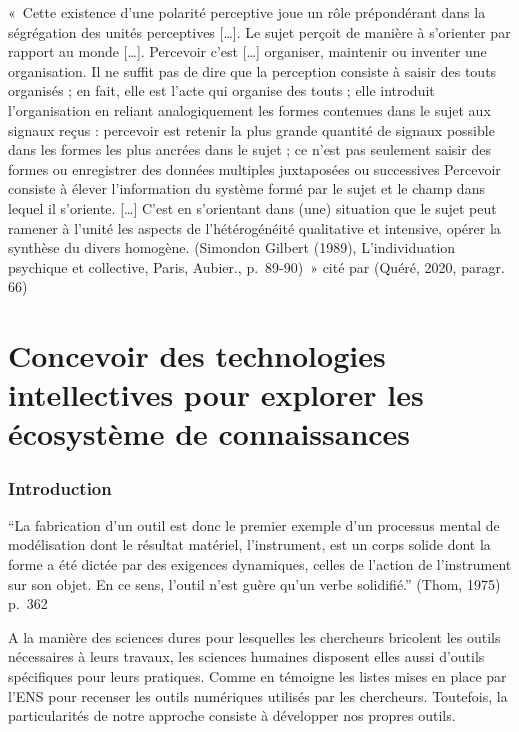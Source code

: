 \documentclass[
  a4paper,
  DIV=11,
  numbers=noendperiod]{scrreprt}
\begin{document}
«~Cette existence d'une polarité perceptive joue un rôle prépondérant
dans la ségrégation des unités perceptives {[}\ldots{]}. Le sujet
perçoit de manière à s'orienter par rapport au monde {[}\ldots{]}.
Percevoir c'est {[}\ldots{]} organiser, maintenir ou inventer une
organisation. Il ne suffit pas de dire que la perception consiste à
saisir des touts organisés ; en fait, elle est l'acte qui organise des
touts ; elle introduit l'organisation en reliant analogiquement les
formes contenues dans le sujet aux signaux reçus : percevoir est retenir
la plus grande quantité de signaux possible dans les formes les plus
ancrées dans le sujet ; ce n'est pas seulement saisir des formes ou
enregistrer des données multiples juxtaposées ou successives Percevoir
consiste à élever l'information du système formé par le sujet et le
champ dans lequel il s'oriente. {[}\ldots{]} C'est en s'orientant dans
(une) situation que le sujet peut ramener à l'unité les aspects de
l'hétérogénéité qualitative et intensive, opérer la synthèse du divers
homogène. (Simondon Gilbert (1989), L'individuation psychique et
collective, Paris, Aubier., p.~89-90)~» cité par (Quéré, 2020, paragr.
66)

\part{Concevoir des technologies intellectives pour explorer les
écosystème de connaissances}

\section*{Introduction}\label{introduction-1}


``La fabrication d'un outil est donc le premier exemple d'un processus
mental de modélisation dont le résultat matériel, l'instrument, est un
corps solide dont la forme a été dictée par des exigences dynamiques,
celles de l'action de l'instrument sur son objet. En ce sens, l'outil
n'est guère qu'un verbe solidifié.'' (Thom, 1975) p.~362

A la manière des sciences dures pour lesquelles les chercheurs bricolent
les outils nécessaires à leurs travaux, les sciences humaines disposent
elles aussi d'outils spécifiques pour leurs pratiques. Comme en témoigne
les listes mises en place par l'ENS pour recenser les outils numériques
utilisés par les chercheurs. Toutefois, la particularités de notre
approche consiste à développer nos propres outils.
\end{document}
